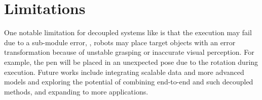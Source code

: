 \section{Limitations}

One notable limitation for decoupled systems like \sofar is that the execution may fail due to a sub-module error,
\ie, robots may place target objects with an error transformation because of unstable grasping or inaccurate visual perception.
For example, the pen will be placed in an unexpected pose due to the rotation during execution.
Future works include integrating scalable data and more advanced models and exploring the potential of combining end-to-end and such decoupled methods, and expanding \sofar to more applications.

